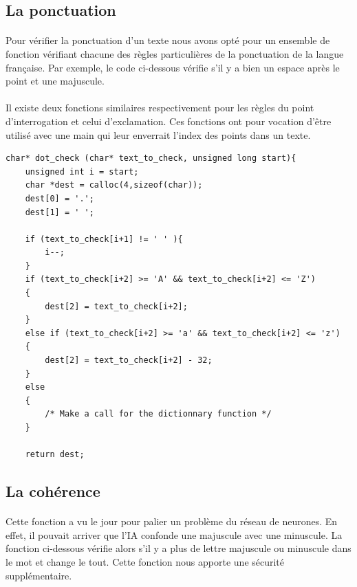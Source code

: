 \documentclass{article}
\begin{document}
\subsection{La ponctuation}

\paragraph{}
Pour vérifier la ponctuation d’un texte nous avons opté pour un ensemble de fonction vérifiant chacune des règles particulières de la ponctuation de la langue française. Par exemple, le code ci-dessous vérifie s'il y a bien un espace après le point et une majuscule.

\paragraph{}Il existe deux fonctions similaires respectivement pour les règles du point d’interrogation et celui d’exclamation. Ces fonctions ont pour vocation d'être utilisé avec une main qui leur enverrait l’index des points dans un texte.

\begin{lstlisting}
char* dot_check (char* text_to_check, unsigned long start){
    unsigned int i = start;
    char *dest = calloc(4,sizeof(char));
    dest[0] = '.';
    dest[1] = ' ';

    if (text_to_check[i+1] != ' ' ){
        i--;
    }
    if (text_to_check[i+2] >= 'A' && text_to_check[i+2] <= 'Z')
    {
        dest[2] = text_to_check[i+2];
    }
    else if (text_to_check[i+2] >= 'a' && text_to_check[i+2] <= 'z')
    {
        dest[2] = text_to_check[i+2] - 32;
    }
    else
    {
        /* Make a call for the dictionnary function */
    }

    return dest;
\end{lstlisting}

\subsection{La cohérence}
\paragraph{}Cette fonction a vu le jour pour palier un problème du réseau de neurones. En effet, il pouvait arriver que l'IA confonde une majuscule avec une minuscule. La fonction ci-dessous vérifie alors s’il y a plus de lettre majuscule ou minuscule dans le mot et change le tout.  Cette fonction nous apporte une sécurité supplémentaire.
\end{document}
